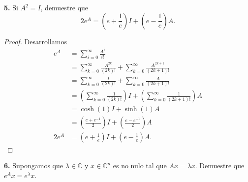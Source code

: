 \documentclass{article}
\newenvironment{statement}[1]{\smallskip\noindent\color[rgb]{1.00,0.00,0.50} {\bf #1.}}{}
\theoremstyle{definition}
\theoremstyle{remark}
\newcommand{\BC}{\mathbb C}
\begin{document}
\begin{statement}{5}
  Si $A^2 = I$, demuestre que
  \[
    2 e^A = (e + \frac{1}{e}) I + (e - \frac{1}{e}) A.
  \]
\end{statement}

\begin{proof}
  Desarrollamos
  \begin{align*}
    e^A &= \sum_{i = 0}^{\infty} \frac{A^i}{i!}\\
    &= \sum_{k = 0}^{\infty} \frac{A^{2k}}{(2k)!} + \sum_{k = 0}^{\infty} \frac{A^{2k + 1}}{(2k + 1)!}\\
    &= \sum_{k = 0}^{\infty} \frac{I}{(2k)!} + \sum_{k = 0}^{\infty} \frac{A}{(2k + 1)!}\\
    &= \left(\sum_{k = 0}^{\infty} \frac{1}{(2k)!}\right) I + \left(\sum_{k = 0}^{\infty} \frac{1}{(2k + 1)!}\right) A\\
    &= \cosh(1) I + \sinh(1) A\\
    &= \left(\frac{e + e^{-1}}{2}\right) I + \left(\frac{e - e^{-1}}{2}\right) A\\
    2 e^A &= \left(e + \frac{1}{e}\right) I + \left(e - \frac{1}{e}\right) A.
  \end{align*}
\end{proof}

\begin{statement}{6}
  Supongamos que $\lambda \in \BC$ y $x \in \BC^n$ es no nulo tal que $Ax = \lambda x$.
  Demuestre que $e^A x = e^{\lambda} x$.
\end{statement}
\end{document}
